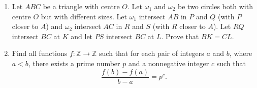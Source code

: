 \documentclass[12pt]{article}
\begin{document}
\begin{enumerate}
\item %
Let $ABC$ be a triangle with centre $O$. Let $\omega_1$ and $\omega_2$ be two circles both with centre $O$ but with different sizes. Let $\omega_1$ intersect $AB$ in $P$ and $Q$ (with $P$ closer to $A$) and $\omega_2$ intersect $AC$ in $R$ and $S$ (with $R$ closer to $A$). Let $RQ$ intersect $BC$ at $K$ and let $PS$ intersect $BC$ at $L$. Prove that $BK = CL$.


\item %
Find all functions $f : \mathbb{Z} \to \mathbb{Z}$ such that for each pair of integers $a$ and $b$, where $a < b$, there exists a prime number $p$ and a nonnegative integer $c$ such that \[ \frac{f(b)-f(a)}{b-a} = p^c. \]


\end{enumerate}
\end{document}
